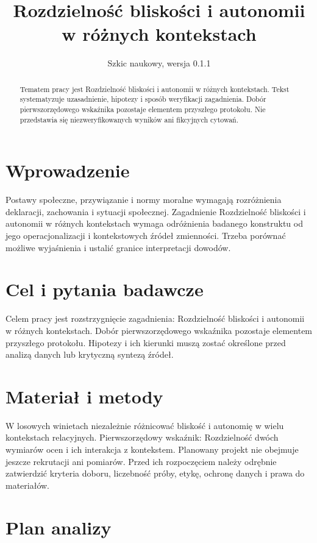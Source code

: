 \documentclass[11pt,a4paper]{article}
\title{Rozdzielność bliskości i autonomii w różnych kontekstach}
\author{}
\date{Szkic naukowy, wersja 0.1.1}
\begin{document}
\maketitle

\begin{abstract}

Tematem pracy jest Rozdzielność bliskości i autonomii w różnych kontekstach. Tekst systematyzuje uzasadnienie, hipotezy i sposób weryfikacji zagadnienia. Dobór pierwszorzędowego wskaźnika pozostaje elementem przyszłego protokołu. Nie przedstawia się niezweryfikowanych wyników ani fikcyjnych cytowań.

\end{abstract}

\section{Wprowadzenie}

Postawy społeczne, przywiązanie i normy moralne wymagają rozróżnienia deklaracji, zachowania i sytuacji społecznej. Zagadnienie Rozdzielność bliskości i autonomii w różnych kontekstach wymaga odróżnienia badanego konstruktu od jego operacjonalizacji i kontekstowych źródeł zmienności. Trzeba porównać możliwe wyjaśnienia i ustalić granice interpretacji dowodów.

\section{Cel i pytania badawcze}

Celem pracy jest rozstrzygnięcie zagadnienia: Rozdzielność bliskości i autonomii w różnych kontekstach. Dobór pierwszorzędowego wskaźnika pozostaje elementem przyszłego protokołu. Hipotezy i ich kierunki muszą zostać określone przed analizą danych lub krytyczną syntezą źródeł.

\section{Materiał i metody}

W losowych winietach niezależnie różnicować bliskość i autonomię w wielu kontekstach relacyjnych. Pierwszorzędowy wskaźnik: Rozdzielność dwóch wymiarów ocen i ich interakcja z kontekstem. Planowany projekt nie obejmuje jeszcze rekrutacji ani pomiarów. Przed ich rozpoczęciem należy odrębnie zatwierdzić kryteria doboru, liczebność próby, etykę, ochronę danych i prawa do materiałów.

\section{Plan analizy}
\end{document}

